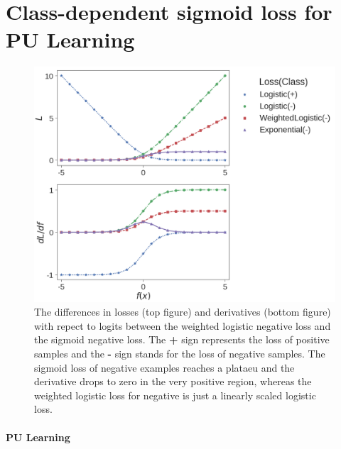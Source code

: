 \section{Class-dependent sigmoid loss for PU Learning}
\label{sec:pulearning}



\begin{figure}[t]
\centering
   \includegraphics[width=1.05\linewidth]{img/losses}
\caption{
The differences in losses (top figure) and derivatives (bottom figure) with repect to logits between the weighted logistic negative loss and the sigmoid negative loss.
The \textbf{+} sign represents the loss of positive samples and the \textbf{-} sign stands for the loss of negative samples.
The sigmoid loss of negative examples reaches a plataeu and the derivative drops to zero in the very positive region, whereas the weighted logistic loss for negative is just a linearly scaled logistic loss.
}
\label{fig:losses}
\end{figure}


\paragraph{PU Learning}

